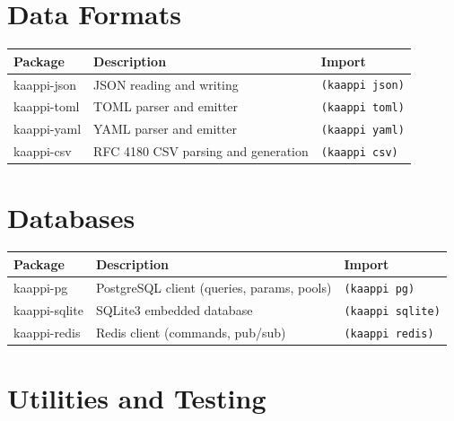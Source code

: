 \section{Data Formats}

\begin{center}
\small
\begin{tabularx}{\textwidth}{@{}lYl@{}}
\textbf{Package} & \textbf{Description} & \textbf{Import} \\
\hline
kaappi-json & JSON reading and writing & \texttt{(kaappi json)} \\
kaappi-toml & TOML parser and emitter & \texttt{(kaappi toml)} \\
kaappi-yaml & YAML parser and emitter & \texttt{(kaappi yaml)} \\
kaappi-csv & RFC 4180 CSV parsing and generation & \texttt{(kaappi csv)} \\
\end{tabularx}
\end{center}

\section{Databases}

\begin{center}
\small
\begin{tabularx}{\textwidth}{@{}lYl@{}}
\textbf{Package} & \textbf{Description} & \textbf{Import} \\
\hline
kaappi-pg & PostgreSQL client (queries, params, pools) & \texttt{(kaappi pg)} \\
kaappi-sqlite & SQLite3 embedded database & \texttt{(kaappi sqlite)} \\
kaappi-redis & Redis client (commands, pub/sub) & \texttt{(kaappi redis)} \\
\end{tabularx}
\end{center}

\section{Utilities and Testing}


